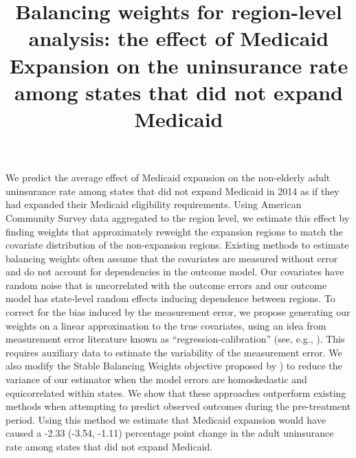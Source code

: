 \documentclass[aoas]{imsart}
\theoremstyle{plain}
\theoremstyle{remark}
\begin{document}
\begin{frontmatter}
\title{Balancing weights for region-level analysis: the effect of Medicaid Expansion on the uninsurance rate among states that did not expand Medicaid}


\begin{flushleft}
We predict the average effect of Medicaid expansion on the non-elderly adult uninsurance rate among states that did not expand Medicaid in 2014 as if they had expanded their Medicaid eligibility requirements. Using American Community Survey data aggregated to the region level, we estimate this effect by finding weights that approximately reweight the expansion regions to match the covariate distribution of the non-expansion regions. Existing methods to estimate balancing weights often assume that the covariates are measured without error and do not account for dependencies in the outcome model. Our covariates have random noise that is uncorrelated with the outcome errors and our outcome model has state-level random effects inducing dependence between regions. To correct for the bias induced by the measurement error, we propose generating our weights on a linear approximation to the true covariates, using an idea from measurement error literature known as ``regression-calibration'' (see, e.g., \cite{carroll2006measurement}). This requires auxiliary data to estimate the variability of the measurement error. We also modify the Stable Balancing Weights objective proposed by \cite{zubizarreta2015stable}) to reduce the variance of our estimator when the model errors are homoskedastic and equicorrelated within states. We show that these approaches outperform existing methods when attempting to predict observed outcomes during the pre-treatment period. Using this method we estimate that Medicaid expansion would have caused a -2.33 (-3.54, -1.11) percentage point change in the adult uninsurance rate among states that did not expand Medicaid.
\end{flushleft}


\begin{keyword}
\end{keyword}

\end{frontmatter}
\end{document}
